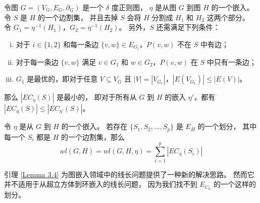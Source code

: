 \begin{lemma}[拥塞引理]
\label{Lemma 3.3}
令图 $G = (V_G, E_G, \partial_G)$ 是一个 $\delta$ 度正则图，
$\eta$ 是从图 $G$ 到图 $H$ 的一个嵌入。
令 $S$ 是 $H$ 的一个边割集，
并且去掉 $S$ 会将 $H$ 分割成 $H_1$ 和 $H_2$ 这两个部分。
令 $G_1 = \eta^{-1}(H_1)$，$G_2 = \eta^{-1}(H_2)$。
另外，$S$ 还需满足下列条件：
\begin{enumerate}[(i)]
\item 对于 $i \in \{1, 2\}$ 和每一条边 $\{v, w\} \in E_{G_i}$，$P(v, w)$ 不在 $S$ 中有边；
\item 对于每一条边 $\{v, w\}$ 满足 $v \in G_1$ 和 $w \in G_2$，$P(v, w)$ 在 $S$ 中只有一条边；
\item $G_1$ 是最优的，即对于任意 $V \subseteq V_G$ 且 $|V| = |V_{G_1}|$，$|E(V_{G_1})| \le |E(V)|$。
\end{enumerate}
那么 $|EC_\eta(S)|$ 是最小的，
即对于所有从 $G$ 到 $H$ 的嵌入 $\eta'$，都有 $|EC_\eta(S)| \le |EC_{\eta'}(S)|$。
\end{lemma}

\begin{lemma}[划分引理]
\label{Lemma 3.4}
令 $\eta$ 是从 $G$ 到 $H$ 的一个嵌入。
若存在 $\{S_1, S_2, \dots, S_p\}$ 是 $E_H$ 的一个划分，
其中每一个 $S_i$ 都是 $H$ 的一个边割集，那么
\begin{equation}
wl(G, H) = wl(G, H, \eta) = \sum_{i = 1}^p |EC_\eta(S_i)|
\end{equation}
\end{lemma}

引理 \ref{Lemma 3.4} 为图嵌入领域中的线长问题提供了一种新的解决思路。
然而它并不适用于从超立方体到环嵌入的线长问题，
因为我们找不到 $E_{C_n}$ 的一个这样的划分。
